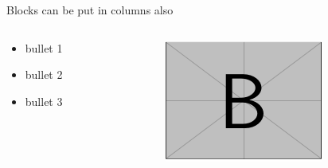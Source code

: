 \documentclass{beamer}
\begin{document}
\begin{frame}
    Blocks can be put in columns also
    \begin{columns}[T]
        \begin{column}{.5\textwidth}
            \begin{block}{}
                \begin{itemize}[<+>]
                    \item bullet 1
                    \item bullet 2
                    \item bullet 3
                \end{itemize} 
            \end{block}
        \end{column}
        \begin{column}{.5\textwidth}
            \begin{block}{}
                \includegraphics[width=\textwidth]{images/examples/image-b.png}
            \end{block}
        \end{column}
    \end{columns}
\end{frame}




\end{document}
